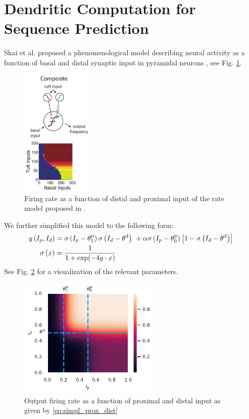 \documentclass[10pt,a4paper,draft]{article}
\begin{document}
\section{Dendritic Computation for Sequence Prediction}


Shai et al. proposed a phenomenological model describing neural activity as a function of basal and distal synaptic input in pyramidal neurons \cite{Shai_2015}, see Fig. \ref{fig:Shai_prox_dist}.
\begin{figure}
\centering
\includegraphics[width=0.3\textwidth]{./figures/shai_phen_model.png}
\caption{Firing rate as a function of distal and proximal input of the rate model proposed in \cite{Shai_2015}.}
\label{fig:Shai_prox_dist}
\end{figure}
We further simplified this model to the following form:
\begin{align}
y\left(I_p,I_d\right) &= \sigma\left(I_p-\theta^{\rm p}_{1}\right) \sigma\left(I_d-\theta^{\rm d}\right)\ +\alpha\sigma\left(I_p-\theta^{\rm p}_{0}\right)\left[ 1 - \sigma\left(I_d-\theta^{\rm d}\right)\right] \label{eq:simpl_prox_dist} \\
\sigma\left(x\right) &= \frac{1}{1+\exp(-4 g\cdot x)} \label{eq:sigmoidal}
\end{align}
See Fig. \ref{fig:simpl_prox_dist} for a visualization of the relevant parameters.

\begin{figure}
\centering
\includegraphics[width=0.6\textwidth]{./figures/plot_comp_mod_marks.pdf}
\caption{Output firing rate as a function of proximal and distal input as given by \eqref{eq:simpl_prox_dist}}
\label{fig:simpl_prox_dist}
\end{figure}
\end{document}
